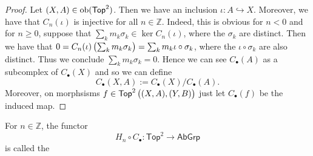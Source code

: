 \begin{proof}
	Let $(X,A) \in \operatorname{ob}(\mathsf{Top}^2)$. Then we have an inclusion $\iota : A \hookrightarrow X$. Moreover, we have that $C_n(\iota)$ is injective for all $n \in \mathbb{Z}$. Indeed, this is obvious for $n < 0$ and for $n \geq 0$, suppose that $\sum_k m_k \sigma_k \in \ker C_n(\iota)$, where the $\sigma_k$ are distinct. Then we have that $0 = C_n(\iota)\del[1]{\sum_k m_k \sigma_k} = \sum_k m_k \iota \circ \sigma_k$, where the $\iota \circ \sigma_k$ are also distinct. Thus we conclude $\sum_k m_k \sigma_k = 0$. Hence we can see $C_\bullet(A)$ as a subcomplex of $C_\bullet(X)$ and so we can define
	\begin{equation*}
		C_\bullet(X,A) := C_\bullet(X)/C_\bullet(A).
	\end{equation*}
	Moreover, on morphsisms $f \in \mathsf{Top}^2\del[1]{(X,A),(Y,B)}$ just let $C_\bullet(f)$ be the induced map.
\end{proof}

\begin{definition}
	For $n \in \mathbb{Z}$, the functor 
	\begin{equation}
		H_n \circ C_\bullet : \mathsf{Top}^2 \to \mathsf{AbGrp}
	\end{equation}
	\noindent is called the 
\end{definition}
